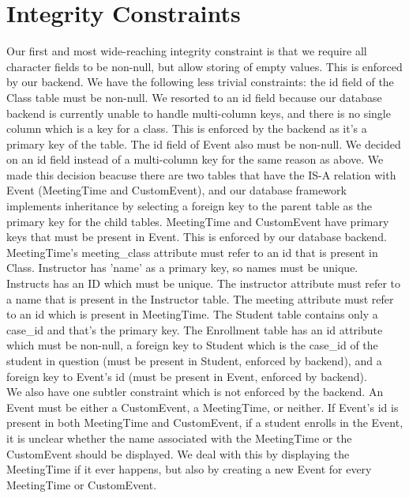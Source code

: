 \documentclass[pdftex,12pt,letter]{article}
\begin{document}
\section{Integrity Constraints}

Our first and most wide-reaching integrity constraint is that we require all character fields to be non-null, but allow storing of empty values.  This is enforced by our backend.
We have the following less trivial constraints:  the id field of the Class table must be non-null.  We resorted to an id field because our database backend is currently unable to handle multi-column keys, and there is no single column which is a key for a class.  This is enforced by the backend as it's a primary key of the table.  
The id field of Event also must be non-null.  We decided on an id field instead of a multi-column key for the same reason as above.  We made this decision beacuse there are two tables that have the IS-A relation with Event (MeetingTime and CustomEvent), and our database framework implements inheritance by selecting a foreign key to the parent table as the primary key for the child tables.
MeetingTime and CustomEvent have primary keys that must be present in Event.  This is enforced by our database backend.  MeetingTime's meeting\_class attribute must refer to an id that is present in Class.
Instructor has 'name' as a primary key, so names must be unique.
Instructs has an ID which must be unique.  The instructor attribute must refer to a name that is present in the Instructor table.  The meeting attribute must refer to an id which is present in MeetingTime.
The Student table contains only a case\_id and that's the primary key.  The Enrollment table has an id attribute which must be non-null, a foreign key to Student which is the case\_id of the student in question (must be present in Student, enforced by backend), and a foreign key to Event's id (must be present in Event, enforced by backend).\\

We also have one subtler constraint which is not enforced by the backend.  An Event must be either a CustomEvent, a MeetingTime, or neither.  If Event's id is present in both MeetingTime and CustomEvent, if a student enrolls in the Event, it is unclear whether the name associated with the MeetingTime or the CustomEvent should be displayed.  We deal with this by displaying the MeetingTime if it ever happens, but also by creating a new Event for every MeetingTime or CustomEvent.\\
\end{document}
